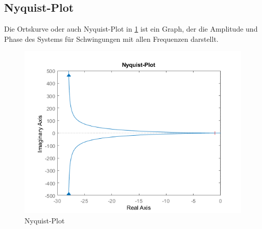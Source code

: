 \subsection{Nyquist-Plot}

Die Ortskurve oder auch Nyquist-Plot in \ref{fig:nyquist-plot} ist ein Graph, der die Amplitude und Phase des Systems für Schwingungen mit allen Frequenzen darstellt.

\begin{figure}[H]
	\centering
	\includegraphics[width=0.7\linewidth]{"diagrams/nyquist diagram"}
	\caption[Nyquist-Plot]{Nyquist-Plot}
	\label{fig:nyquist-plot}
\end{figure}